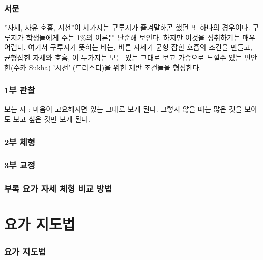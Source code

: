 \documentclass[12pt, a4paper, oneside]{book}
\let\stdsection\section
\renewcommand\section{\newpage\stdsection}
\begin{document}
	\section{서문}

''자세, 자유 호흡, 시선''이 세가지는 구루지가 즐겨말하곤 했던 또 하나의 경우이다.
구루지가 학생들에게 주는 1\%의 이론은 단순해 보인다.
하지만 이것을 성취하기는 매우 어렵다.
여기서 구루지가 뜻하는 바는, 바른 자세가 균형 잡힌 호흡의 조건을 만들고, 균형잡힌 자세와 호흡, 이 두가지는 모든 있는 그대로 보고 가슴으로 느낄수 있는 편안한(수카 Sukha) '시선' (드리스티)을 위한 제반 조건들을 형성한다.




	\section{1부 관찰}
보는 자 :
마음이 고요해지면 있는 그대로 보게 된다.
그렇지 않을 때는 많은 것을 보아도
보고 싶은 것만 보게 된다.


	\section{2부 체형}
	\section{3부 교정}
	\section{부록 요가 자세 체형 비교 방법}




	\part{요가 지도법}
	\noptcrule
	\parttoc				

	\section{요가 지도법}




\end{document}
